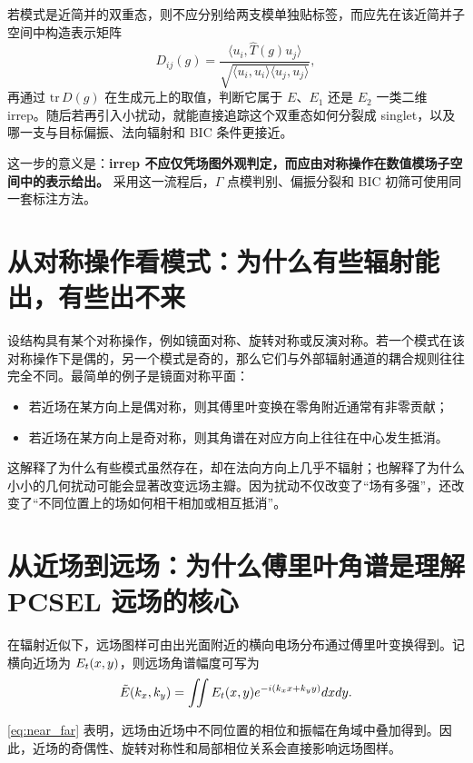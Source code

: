 若模式是近简并的双重态，则不应分别给两支模单独贴标签，而应先在该近简并子空间中构造表示矩阵
\begin{equation}
D_{ij}(g)
=
\frac{\langle u_i,\hat T(g)u_j\rangle}{\sqrt{\langle u_i,u_i\rangle\langle u_j,u_j\rangle}},
\label{eq:irrep_projection_doublet}
\end{equation}
再通过 $\mathrm{tr}\,D(g)$ 在生成元上的取值，判断它属于 $E$、$E_1$ 还是 $E_2$ 一类二维 irrep。随后若再引入小扰动，就能直接追踪这个双重态如何分裂成 singlet，以及哪一支与目标偏振、法向辐射和 BIC 条件更接近。

这一步的意义是：\textbf{irrep 不应仅凭场图外观判定，而应由对称操作在数值模场子空间中的表示给出。} 采用这一流程后，$\Gamma$ 点模判别、偏振分裂和 BIC 初筛可使用同一套标注方法。

\section{从对称操作看模式：为什么有些辐射能出，有些出不来}
设结构具有某个对称操作，例如镜面对称、旋转对称或反演对称。若一个模式在该对称操作下是偶的，另一个模式是奇的，那么它们与外部辐射通道的耦合规则往往完全不同。最简单的例子是镜面对称平面：

\begin{itemize}
  \item 若近场在某方向上是偶对称，则其傅里叶变换在零角附近通常有非零贡献；
  \item 若近场在某方向上是奇对称，则其角谱在对应方向上往往在中心发生抵消。
\end{itemize}

这解释了为什么有些模式虽然存在，却在法向方向上几乎不辐射；也解释了为什么小小的几何扰动可能会显著改变远场主瓣。因为扰动不仅改变了“场有多强”，还改变了“不同位置上的场如何相干相加或相互抵消”。

\section{从近场到远场：为什么傅里叶角谱是理解 PCSEL 远场的核心}
在辐射近似下，远场图样可由出光面附近的横向电场分布通过傅里叶变换得到。记横向近场为 $E_t(x,y)$，则远场角谱幅度可写为
\begin{equation}
\tilde{E}(k_x,k_y)
=
\iint E_t(x,y)e^{-i(k_xx+k_yy)}d xd y.
\label{eq:near_far}
\end{equation}

\cref{eq:near_far} 表明，远场由近场中不同位置的相位和振幅在角域中叠加得到。因此，近场的奇偶性、旋转对称性和局部相位关系会直接影响远场图样。

